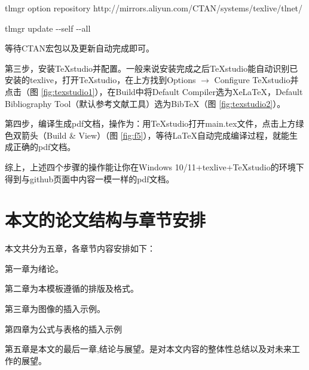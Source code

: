 \noindent tlmgr option repository http://mirrors.aliyun.com/CTAN/systems/texlive/tlnet/

\noindent tlmgr update $ \text{-}\text{-} $self $ \text{-}\text{-} $all

\noindent 等待CTAN宏包以及更新自动完成即可。


第三步，安装TeXstudio并配置。一般来说安装完成之后TeXstudio能自动识别已安装的texlive，打开TeXstudio，在上方找到Options $\rightarrow$ Configure TeXstudio并点击（图 \ref{fig:texstudio1}），在Build中将Default Compiler选为XeLaTeX，Default Bibliography Tool（默认参考文献工具）选为BibTeX（图 \ref{fig:texstudio2}）。



第四步，编译生成pdf文档，操作为：用TeXstudio打开main.tex文件，点击上方绿色双箭头（Build \& View）（图 \ref{fig:f5}），等待LaTeX自动完成编译过程，就能生成正确的pdf文档。


综上，上述四个步骤的操作能让你在Windows 10/11+texlive+TeXstudio的环境下得到与github页面中内容一模一样的pdf文档。

\section{本文的论文结构与章节安排}
\label{sec:arrangement}
本文共分为五章，各章节内容安排如下：

第一章为绪论。

第二章为本模板遵循的排版及格式。

第三章为图像的插入示例。

第四章为公式与表格的插入示例

第五章是本文的最后一章,结论与展望。是对本文内容的整体性总结以及对未来工作的展望。

